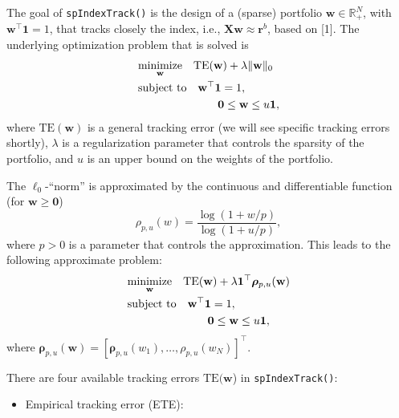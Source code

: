 \documentclass[]{article}
\providecommand{\tightlist}{%
  \setlength{\itemsep}{0pt}\setlength{\parskip}{0pt}}
\begin{document}
The goal of \texttt{spIndexTrack()} is the design of a (sparse)
portfolio \(\mathbf{w}\in\mathbb{R}_+^N\), with
\(\mathbf{w}^\top\mathbf{1} = 1\), that tracks closely the index, i.e.,
\(\mathbf{X}\mathbf{w} \approx \mathbf{r}^b\), based on {[}1{]}. The
underlying optimization problem that is solved is \[\begin{equation}
\begin{aligned}\label{opt:joint_index_tracking}
    &\underset{\mathbf{w}}{\text{minimize}}\quad \text{TE}(\mathbf{w}) + \lambda\|\mathbf{w}\|_0\\
    &\text{subject to}\quad \mathbf{w}^\top\mathbf{1}=1,\\
    &\hspace{25mm} \mathbf{0}\leq\mathbf{w}\leq u\mathbf{1},
\end{aligned}
\end{equation}\] where \(\text{TE}(\mathbf{w})\) is a general tracking
error (we will see specific tracking errors shortly), \(\lambda\) is a
regularization parameter that controls the sparsity of the portfolio,
and \(u\) is an upper bound on the weights of the portfolio.

The \(\ell_0\)-``norm'' is approximated by the continuous and
differentiable function (for \(\mathbf{w} \geq \mathbf{0}\)) \[
\begin{equation}\label{eq:approx_func_u}
\rho_{p,u}(w) = \frac{\log(1 + w/p)}{\log(1 + u/p)},
\end{equation} 
\] where \(p>0\) is a parameter that controls the approximation. This
leads to the following approximate problem: \[\begin{equation}
\begin{aligned}\label{opt:joint_index_tracking_approx}
    &\underset{\mathbf{w}}{\text{minimize}}\quad \text{TE}(\mathbf{w}) + \lambda\mathbf{1}^\top\bm{\rho}_{p,u}(\mathbf{w})\\
    &\text{subject to}\quad \mathbf{w}^\top\mathbf{1}=1,\\
    &\hspace{25mm} \mathbf{0}\leq\mathbf{w}\leq u\mathbf{1},
\end{aligned}
\end{equation}\] where
\(\bm{\rho}_{p,u}(\mathbf{w})=[\mathbf{\rho}_{p,u}(w_1),\dots,\rho_{p,u}(w_N)]^\top\).

There are four available tracking errors \(\text{TE}(\mathbf{w}\)) in
\texttt{spIndexTrack()}:

\begin{itemize}
\tightlist
\item
  Empirical tracking error (ETE):
\end{itemize}
\end{document}
